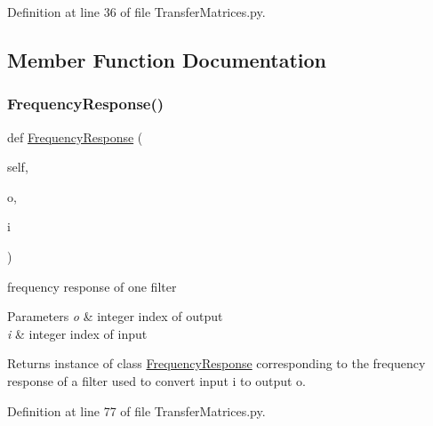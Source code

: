 Definition at line 36 of file Transfer\+Matrices.\+py.



\subsection{Member Function Documentation}
\mbox{\label{classSignalIntegrity_1_1FrequencyDomain_1_1TransferMatrices_1_1TransferMatrices_ae45a1bf3658b88340881c2be54c27dbe}} 
\subsubsection{\texorpdfstring{Frequency\+Response()}{FrequencyResponse()}}
{\footnotesize\ttfamily def \hyperlink{classSignalIntegrity_1_1FrequencyDomain_1_1FrequencyResponse_1_1FrequencyResponse}{Frequency\+Response} (\begin{DoxyParamCaption}\item[{}]{self,  }\item[{}]{o,  }\item[{}]{i }\end{DoxyParamCaption})}



frequency response of one filter 


\begin{DoxyParams}{Parameters}
{\em o} & integer index of output \\
\hline
{\em i} & integer index of input \\
\hline
\end{DoxyParams}
\begin{DoxyReturn}{Returns}
instance of class \hyperlink{namespaceSignalIntegrity_1_1FrequencyDomain_1_1FrequencyResponse}{Frequency\+Response} corresponding to the frequency response of a filter used to convert input i to output o. 
\end{DoxyReturn}


Definition at line 77 of file Transfer\+Matrices.\+py.

